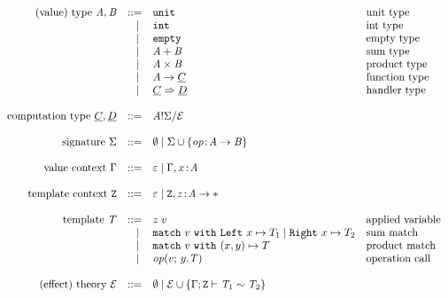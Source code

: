 
\[
	\begin{array}{rrll}
		\text{(value) type}~\tyA, \tyB
		 & ::=   & \unittype          				& \text{unit type}			\\
		 & \vsep & \inttype         					& \text{int type}				\\
		 & \vsep & \emptytype         				& \text{empty type}			\\
		 & \vsep & \sumtype{\tyA}{\tyB}   		& \text{sum type}				\\
		 & \vsep & \producttype{\tyA}{\tyB}   & \text{product type}		\\
		 & \vsep & \tyA \to \ctyC     				& \text{function type}	\\
		 & \vsep & \ctyC \hto \ctyD   				& \text{handler type}		\\
		\\
		\text{computation type}~\ctyC, \ctyD
		 & ::=   & \ctype{\tyA}{\sig}{\eqE} \\
		\\
		\text{signature}~\sig
		 & ::=   & \nil \vsep \sig \union \set{{\op \oftype \tyA \to \tyB}} \\
		\\
		\text{value context}~\ctx
		 & ::=   & \varepsilon \vsep \ctx, x \oftype \tyA \\
		\\
		\text{template context}~\tvars
		 & ::=   & \varepsilon \vsep \tvars, z \oftype \tyA \to \anytype \\
		\\
		\text{template}~\tmplT
		 & ::=   & \apply{z}{v} & \text{applied variable} 											\\
		 & \vsep & \match{v} 	\inleft{x} \mapsto T_1 
		 	 \vsep	 \inright{x} \mapsto T_2  & \text{sum match}		 							\\
		 & \vsep & \match{v} \pair{x}{y} \mapsto T & \text{product match} 			\\
		 & \vsep & \operation{v}{y.\tmplT} & \text{operation call} 							\\
		\\
		\text{(effect) theory}~\eqE
		 & ::=   & \nil \vsep \eqE \union
							 \set{\teqjudgement{\tenv}{\tmplT_1 \rel \tmplT_2}} \\
	\end{array}
\]
